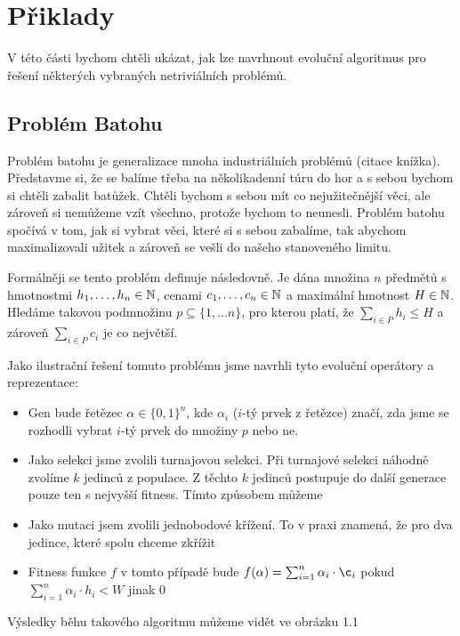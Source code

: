 \section{Přiklady}

V této části bychom chtěli ukázat, jak lze navrhnout evoluční algoritmus pro řešení některých vybraných netriviálních problémů.

\subsection{Problém Batohu}

Problém batohu je generalizace mnoha industriálních problémů (citace knížka). Představme si, že se balíme třeba na několikadenní túru do hor a s sebou bychom si chtěli zabalit batůžek. Chtěli bychom s sebou mít co nejužitečnější věci, ale zároveň si nemůžeme vzít všechno, protože bychom to neunesli. Problém batohu spočívá v tom, jak si vybrat věci, které si s sebou zabalíme, tak abychom maximalizovali užitek a zároveň se vešli do našeho stanoveného limitu.

Formálněji se tento problém definuje následovně. Je dána množina $n$ předmětů s hmotnostmi $h_1, \dots, h_n \in \mathbb{N}$, cenami $c_1, \dots, c_n \in \mathbb{N}$ a maximální hmotnost $H \in \mathbb{N}$. Hledáme takovou podmnožinu $p \subseteq \{1, \dots n\}$, pro kterou platí, že $\sum_{i \in P} h_i \leq H$ a zároveň $\sum_{i \in P} c_i$ je co největší.

Jako ilustrační řešení tomuto problému jsme navrhli tyto evoluční operátory a reprezentace:
\begin{itemize}
    \item Gen bude řetězec $\alpha \in \{0,1\}^n$, kde $\alpha_i$ ($i$-tý prvek z řetězce) značí, zda jsme se rozhodli vybrat $i$-tý prvek do množiny $p$ nebo ne.
    \item Jako selekci jsme zvolili turnajovou selekci. Při turnajové selekci náhodně zvolíme $k$ jedinců z populace. Z těchto $k$ jedinců postupuje do další generace pouze ten s nejvyšší fitness. Tímto způsobem můžeme
    \item Jako mutaci jsem zvolili jednobodové křížení. To v praxi znamená, že pro dva jedince, které spolu chceme zkřížit
    \item Fitness funkce $f$ v tomto případě bude $f(\alpha) = \sum_{i=1}^n \alpha_i \cdot \c_i$ pokud $\sum_{i=1}^n \alpha_i \cdot h_i < W$ jinak $0$
\end{itemize}

Výsledky běhu takového algoritmu můžeme vidět ve obrázku 1.1

